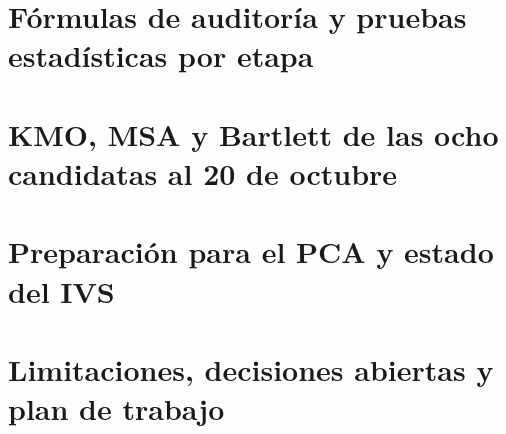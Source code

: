 \section{Fórmulas de auditoría y pruebas estadísticas por etapa}
\label{sec:formulas_pruebas}


\section{KMO, MSA y Bartlett de las ocho candidatas al 20 de octubre}
\label{sec:kmo_actual}


\section{Preparación para el PCA y estado del IVS}
\label{sec:pca_estado}


\section{Limitaciones, decisiones abiertas y plan de trabajo}
\label{sec:limitaciones_pendientes}

